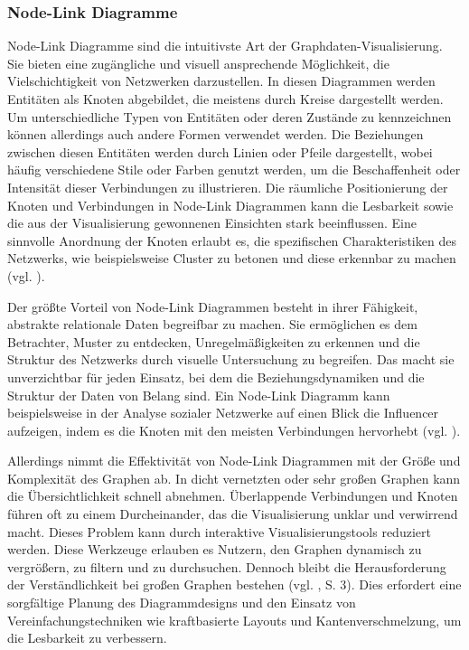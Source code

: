 \subsubsection{Node-Link Diagramme}

Node-Link Diagramme sind die intuitivste Art der Graphdaten-Visualisierung. Sie bieten eine zugängliche und visuell ansprechende Möglichkeit, die Vielschichtigkeit von Netzwerken darzustellen. In diesen Diagrammen werden Entitäten als Knoten abgebildet, die meistens durch Kreise dargestellt werden. Um unterschiedliche Typen von Entitäten oder deren Zustände zu kennzeichnen können allerdings auch andere Formen verwendet werden. Die Beziehungen zwischen diesen Entitäten werden durch Linien oder Pfeile dargestellt, wobei häufig verschiedene Stile oder Farben genutzt werden, um die Beschaffenheit oder Intensität dieser Verbindungen zu illustrieren. Die räumliche Positionierung der Knoten und Verbindungen in Node-Link Diagrammen kann die Lesbarkeit sowie die aus der Visualisierung gewonnenen Einsichten stark beeinflussen. Eine sinnvolle Anordnung der Knoten erlaubt es, die spezifischen Charakteristiken des Netzwerks, wie beispielsweise Cluster zu betonen und diese erkennbar zu machen (vgl. \cite{nodelink:Basics}).

Der größte Vorteil von Node-Link Diagrammen besteht in ihrer Fähigkeit, abstrakte relationale Daten begreifbar zu machen. Sie ermöglichen es dem Betrachter, Muster zu entdecken, Unregelmäßigkeiten zu erkennen und die Struktur des Netzwerks durch visuelle Untersuchung zu begreifen. Das macht sie unverzichtbar für jeden Einsatz, bei dem die Beziehungsdynamiken und die Struktur der Daten von Belang sind. Ein Node-Link Diagramm kann beispielsweise in der Analyse sozialer Netzwerke auf einen Blick die Influencer aufzeigen, indem es die Knoten mit den meisten Verbindungen hervorhebt (vgl. \cite{nodelink:Basics}).

Allerdings nimmt die Effektivität von Node-Link Diagrammen mit der Größe und Komplexität des Graphen ab. In dicht vernetzten oder sehr großen Graphen kann die Übersichtlichkeit schnell abnehmen. Überlappende Verbindungen und Knoten führen oft zu einem Durcheinander, das die Visualisierung unklar und verwirrend macht. Dieses Problem kann durch interaktive Visualisierungstools reduziert werden. Diese Werkzeuge erlauben es Nutzern, den Graphen dynamisch zu vergrößern, zu filtern und zu durchsuchen. Dennoch bleibt die Herausforderung der Verständlichkeit bei großen Graphen bestehen (vgl. \cite{nodelink:DynamicGraph}, S. 3). Dies erfordert eine sorgfältige Planung des Diagrammdesigns und den Einsatz von Vereinfachungstechniken wie kraftbasierte Layouts und Kantenverschmelzung, um die Lesbarkeit zu verbessern.

